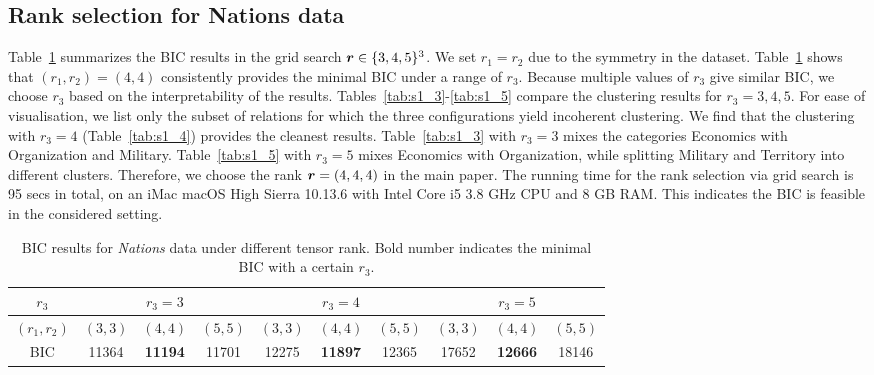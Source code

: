 \documentclass[12pt]{article}
\theoremstyle{definition}
\begin{document}
\subsection{Rank selection for Nations data}
Table~\ref{tab:rank_select} summarizes the BIC results in the grid search $\bm{r}\in \{3,4,5\}^3$. We set $r_1=r_2$ due to the symmetry in the dataset. Table~\ref{tab:rank_select} shows that $(r_1,r_2)=(4,4)$ consistently provides the minimal BIC under a range of $r_3$. Because multiple values of $r_3$ give similar BIC, we choose $r_3$ based on the interpretability of the results. Tables~\ref{tab:s1_3}-\ref{tab:s1_5} compare the clustering results for $r_3=3,4,5$. For ease of visualisation, we list only the subset of relations for which the three configurations yield incoherent clustering. We find that the clustering with $r_3 = 4$ (Table~\ref{tab:s1_4}) provides the cleanest results. Table~\ref{tab:s1_3} with $r_3 = 3$ mixes the categories Economics with Organization and Military. Table~\ref{tab:s1_5} with $r_3 = 5$ mixes Economics with Organization, while splitting Military and Territory into different clusters. Therefore, we choose the rank $\bm{r}=(4,4,4)$ in the main paper. The running time for the rank selection via grid search is 95 secs in total, on an iMac macOS High Sierra 10.13.6 with Intel Core i5 3.8 GHz CPU and 8 GB RAM. This indicates the BIC is feasible in the considered setting. 


     \begingroup
     \setlength{\tabcolsep}{4.5pt} %
    \renewcommand{\arraystretch}{1} %
     \begin{table}[htb]
         \centering
         \begin{tabular}{c||ccc|ccc|ccc}
         $r_3$ & \multicolumn{3}{c|}{ $r_3 = 3$} & \multicolumn{3}{c|}{ $r_3 = 4$} & \multicolumn{3}{c}{ $r_3 = 5$}\\
         \hline
             $(r_1,r_2)$ & $(3,3)$ &  $(4,4)$ &  $(5,5)$ & $(3,3)$ &  $(4,4)$ &  $(5,5)$ &  $(3,3)$ &  $(4,4)$ &  $(5,5)$ \\
             \hline\hline
              BIC& 11364 & {\bf 11194} & 11701 & 12275 & {\bf 11897} & 12365 & 17652 & {\bf 12666} & 18146\\
         \end{tabular}
         \caption{BIC results for {\it Nations} data under different tensor rank. Bold number indicates the minimal BIC with a certain $r_3$. }
         \label{tab:rank_select}
     \end{table}
     \endgroup
     
\end{document}
